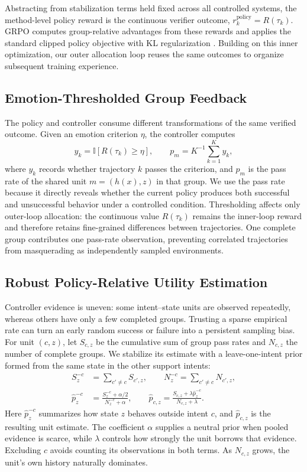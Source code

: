 \documentclass[letterpaper]{article}
\begin{document}
Abstracting from stabilization terms held fixed across all controlled systems, the method-level policy reward is the continuous verifier outcome, $r_k^{\mathrm{policy}}=R(\tau_k)$. GRPO computes group-relative advantages from these rewards and applies the standard clipped policy objective with KL regularization \cite{deepseekmath2024,ppo2017}. Building on this inner optimization, our outer allocation loop reuses the same outcomes to organize subsequent training experience.

\subsection{Emotion-Thresholded Group Feedback}
The policy and controller consume different transformations of the same verified outcome. Given an emotion criterion $\eta$, the controller computes
\begin{equation}
y_k=\mathbb I[R(\tau_k)\geq\eta],
\qquad
p_m=K^{-1}\sum_{k=1}^{K}y_k ,
\label{eq:passrate}
\end{equation}
where $y_k$ records whether trajectory $k$ passes the criterion, and $p_m$ is the pass rate of the shared unit $m=(h(x),z)$ in that group. We use the pass rate because it directly reveals whether the current policy produces both successful and unsuccessful behavior under a controlled condition. Thresholding affects only outer-loop allocation: the continuous value $R(\tau_k)$ remains the inner-loop reward and therefore retains fine-grained differences between trajectories. One complete group contributes one pass-rate observation, preventing correlated trajectories from masquerading as independently sampled environments.

\subsection{Robust Policy-Relative Utility Estimation}
Controller evidence is uneven: some intent--state units are observed repeatedly, whereas others have only a few completed groups. Trusting a sparse empirical rate can turn an early random success or failure into a persistent sampling bias. For unit $(c,z)$, let $S_{c,z}$ be the cumulative sum of group pass rates and $N_{c,z}$ the number of complete groups. We stabilize its estimate with a leave-one-intent prior formed from the same state in the other support intents:
\begin{equation}
\begin{aligned}
S_z^{-c}&=\sum_{c'\neq c}S_{c',z},\qquad
N_z^{-c}=\sum_{c'\neq c}N_{c',z},\\
\hat p_z^{-c}&=\frac{S_z^{-c}+\alpha/2}{N_z^{-c}+\alpha},
\qquad
\hat p_{c,z}=\frac{S_{c,z}+\lambda\hat p_z^{-c}}{N_{c,z}+\lambda}.
\end{aligned}
\label{eq:shrink}
\end{equation}
Here $\hat p_z^{-c}$ summarizes how state $z$ behaves outside intent $c$, and $\hat p_{c,z}$ is the resulting unit estimate. The coefficient $\alpha$ supplies a neutral prior when pooled evidence is scarce, while $\lambda$ controls how strongly the unit borrows that evidence. Excluding $c$ avoids counting its observations in both terms. As $N_{c,z}$ grows, the unit's own history naturally dominates.
\end{document}
